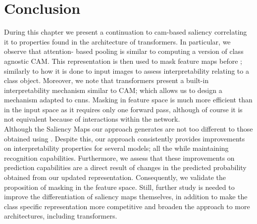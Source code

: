 \section{Conclusion}
\label{sec:ca_conclusion}
During this chapter we present a continuation to \gls{cam}-based saliency correlating it to 
properties found in the architecture of transformers. In particular, we observe that attention-
based pooling is similar to computing a version of class agnostic CAM. This representation is then 
used to mask feature maps before \gap; similarly to how  it is done to input images to assess 
interpretability relating to a class object. Moreover, we note that transformers present a built-in 
interpretability mechanism similar to CAM; which allows us to design a mechanism adapted to 
\glspl{cnn}. Masking in feature space is much more efficient than in the input space as it requires 
only one forward pass, although of course it is not equivalent because of interactions within the 
network.\\

\noindent Although the Saliency Maps our approach generates are not too different to those obtained 
using \gap. Despite this, our approach consistently provides improvements on interpretability 
properties for several models; all the while maintaining recognition capabilities. Furthermore, we 
assess that these improvements on prediction capabilities are a direct result of changes in the 
predicted probability obtained from our updated representation. Consequently, we validate the 
proposition of masking in the feature space. Still, further study is needed to improve the 
differentiation of saliency maps themselves, in addition to make the class specific representation 
more competitive and broaden the approach to more architectures, including transformers.

